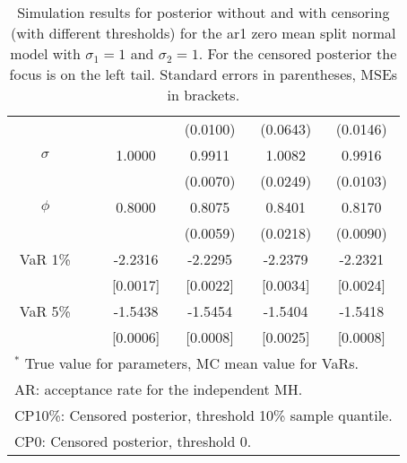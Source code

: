 {\begin{table}
\begin{tabular}{cc cccc}
&&   & (0.0100) & (0.0643) & (0.0146)  \\ 
$\sigma$&& 1.0000 & 0.9911 & 1.0082 & 0.9916  \\ 
&&   & (0.0070) & (0.0249) & (0.0103)  \\ 
$\phi$&& 0.8000 & 0.8075 & 0.8401 & 0.8170  \\ 
&&   & (0.0059) & (0.0218) & (0.0090)  \\ 
VaR 1\% && -2.2316 & -2.2295 & -2.2379 & -2.2321  \\ 
  && [0.0017] & [0.0022] & [0.0034] & [0.0024]  \\ 
VaR 5\% && -1.5438 & -1.5454 & -1.5404 & -1.5418  \\ 
 && [0.0006] & [0.0008] & [0.0025] & [0.0008]  \\ 
\hline 
\multicolumn{6}{l}{\footnotesize{$^*$ True value for parameters, MC mean value for VaRs.}}  \\ 
\multicolumn{6}{l}{\footnotesize{AR: acceptance rate for the independent MH.}}  \\ 
\multicolumn{6}{l}{\footnotesize{CP10\%: Censored posterior, threshold 10\% sample quantile.}}  \\ 
\multicolumn{6}{l}{\footnotesize{CP0: Censored posterior, threshold 0.}} 
\end{tabular}
 \caption{Simulation results for posterior without and with censoring (with different thresholds) for the ar1 zero mean split normal model with $\sigma_{1} = 1$ and $\sigma_{2} = 1$. For the censored posterior the focus is on the left tail. Standard errors in parentheses, MSEs in brackets.} 
\label{tab:ar1_s1}  
\end{table}
}
